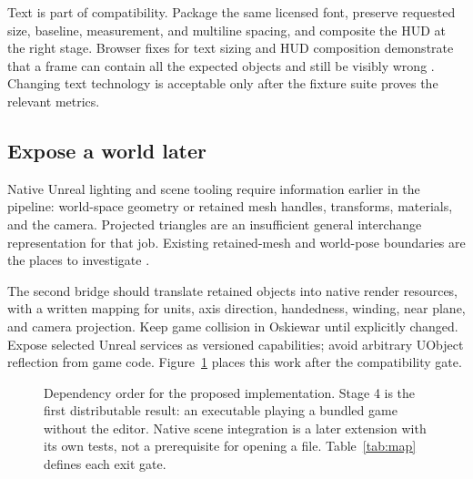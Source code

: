 \documentclass[10pt,letterpaper,twocolumn]{article}
\begin{document}
Text is part of compatibility. Package the same licensed font, preserve requested size, baseline, measurement, and multiline spacing, and composite the HUD at the right stage. Browser fixes for text sizing and HUD composition demonstrate that a frame can contain all the expected objects and still be visibly wrong \citep{player}. Changing text technology is acceptable only after the fixture suite proves the relevant metrics.

\subsection{Expose a world later}
Native Unreal lighting and scene tooling require information earlier in the pipeline: world-space geometry or retained mesh handles, transforms, materials, and the camera. Projected triangles are an insufficient general interchange representation for that job. Existing retained-mesh and world-pose boundaries are the places to investigate \citep{split}.

The second bridge should translate retained objects into native render resources, with a written mapping for units, axis direction, handedness, winding, near plane, and camera projection. Keep game collision in Oskiewar until explicitly changed. Expose selected Unreal services as versioned capabilities; avoid arbitrary UObject reflection from game code. Figure~\ref{fig:sequence} places this work after the compatibility gate.

\begin{figure}[t]
\centering
{}
\caption{Dependency order for the proposed implementation. Stage 4 is the first distributable result: an executable playing a bundled game without the editor. Native scene integration is a later extension with its own tests, not a prerequisite for opening a file. Table~\ref{tab:map} defines each exit gate.}
\label{fig:sequence}
\end{figure}
\end{document}

